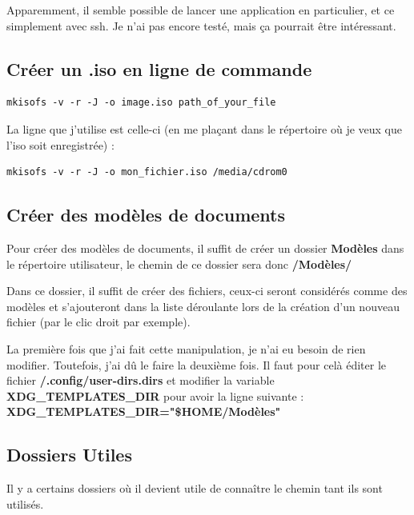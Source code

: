 \documentclass[a4paper,twoside]{article}
\begin{document}
\bigskip

Apparemment, il semble possible de lancer une application en particulier, et ce simplement avec ssh. Je n'ai pas encore testé, mais ça pourrait être intéressant.

\subsection{Créer un .iso en ligne de commande}
\begin{verbatim}
mkisofs -v -r -J -o image.iso path_of_your_file
\end{verbatim}

\begin{remarque}
La ligne que j'utilise est celle-ci (en me plaçant dans le répertoire où je veux que l'iso soit enregistrée) :
\begin{verbatim}
mkisofs -v -r -J -o mon_fichier.iso /media/cdrom0
\end{verbatim}
\end{remarque}

\subsection{Créer des modèles de documents}
Pour créer des modèles de documents, il suffit de créer un dossier \textbf{Modèles} dans le répertoire utilisateur, le chemin de ce dossier sera donc \textbf{\texttildelow/Modèles/}

Dans ce dossier, il suffit de créer des fichiers, ceux-ci seront considérés comme des modèles et s'ajouteront dans la liste déroulante lors de la création d'un nouveau fichier (par le clic droit par exemple).

\begin{remarque}
La première fois que j'ai fait cette manipulation, je n'ai eu besoin de rien modifier. Toutefois, j'ai dû le faire la deuxième fois. Il faut pour celà éditer le fichier \textbf{\texttildelow/.config/user-dirs.dirs} et modifier la variable \textbf{XDG\_TEMPLATES\_DIR} pour avoir la ligne suivante : \textbf{XDG\_TEMPLATES\_DIR="\$HOME/Modèles"}
\end{remarque}

\subsection{Dossiers Utiles}
Il y a certains dossiers où il devient utile de connaître le chemin tant ils sont utilisés.
\end{document}
